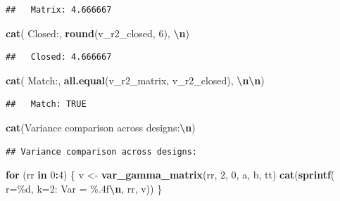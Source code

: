 \documentclass[
]{article}
\newenvironment{Shaded}{\begin{snugshade}}{\end{snugshade}}
\newcommand{\ControlFlowTok}[1]{\textcolor[rgb]{0.13,0.29,0.53}{\textbf{#1}}}
\newcommand{\DecValTok}[1]{\textcolor[rgb]{0.00,0.00,0.81}{#1}}
\newcommand{\FunctionTok}[1]{\textcolor[rgb]{0.13,0.29,0.53}{\textbf{#1}}}
\newcommand{\NormalTok}[1]{#1}
\newcommand{\OtherTok}[1]{\textcolor[rgb]{0.56,0.35,0.01}{#1}}
\newcommand{\SpecialCharTok}[1]{\textcolor[rgb]{0.81,0.36,0.00}{\textbf{#1}}}
\newcommand{\StringTok}[1]{\textcolor[rgb]{0.31,0.60,0.02}{#1}}
\begin{document}
\begin{verbatim}
##   Matrix: 4.666667
\end{verbatim}

\begin{Shaded}
\begin{Highlighting}[]
\FunctionTok{cat}\NormalTok{(}\StringTok{\textquotesingle{}  Closed:\textquotesingle{}}\NormalTok{, }\FunctionTok{round}\NormalTok{(v\_r2\_closed, }\DecValTok{6}\NormalTok{), }\StringTok{\textquotesingle{}}\SpecialCharTok{\textbackslash{}n}\StringTok{\textquotesingle{}}\NormalTok{)}
\end{Highlighting}
\end{Shaded}

\begin{verbatim}
##   Closed: 4.666667
\end{verbatim}

\begin{Shaded}
\begin{Highlighting}[]
\FunctionTok{cat}\NormalTok{(}\StringTok{\textquotesingle{}  Match:\textquotesingle{}}\NormalTok{,}
    \FunctionTok{all.equal}\NormalTok{(v\_r2\_matrix, v\_r2\_closed), }\StringTok{\textquotesingle{}}\SpecialCharTok{\textbackslash{}n\textbackslash{}n}\StringTok{\textquotesingle{}}\NormalTok{)}
\end{Highlighting}
\end{Shaded}

\begin{verbatim}
##   Match: TRUE
\end{verbatim}

\begin{Shaded}
\begin{Highlighting}[]
\FunctionTok{cat}\NormalTok{(}\StringTok{\textquotesingle{}Variance comparison across designs:}\SpecialCharTok{\textbackslash{}n}\StringTok{\textquotesingle{}}\NormalTok{)}
\end{Highlighting}
\end{Shaded}

\begin{verbatim}
## Variance comparison across designs:
\end{verbatim}

\begin{Shaded}
\begin{Highlighting}[]
\ControlFlowTok{for}\NormalTok{ (rr }\ControlFlowTok{in} \DecValTok{0}\SpecialCharTok{:}\DecValTok{4}\NormalTok{) \{}
\NormalTok{  v }\OtherTok{\textless{}{-}} \FunctionTok{var\_gamma\_matrix}\NormalTok{(rr, }\DecValTok{2}\NormalTok{, }\DecValTok{0}\NormalTok{, a, b, tt)}
  \FunctionTok{cat}\NormalTok{(}\FunctionTok{sprintf}\NormalTok{(}\StringTok{\textquotesingle{}  r=\%d, k=2: Var = \%.4f}\SpecialCharTok{\textbackslash{}n}\StringTok{\textquotesingle{}}\NormalTok{, rr, v))}
\NormalTok{\}}
\end{Highlighting}
\end{Shaded}
\end{document}
